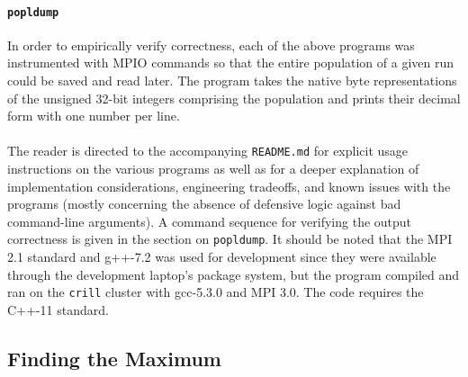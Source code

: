 \documentclass[11pt,epsf]{article}
\begin{document}
{{    \paragraph{\texttt{popldump}}{
      In order to empirically verify correctness, each of the above programs
      was instrumented with MPIO\autocite{MPIO} commands so that the
      entire population of a given run could be saved and read later.
      The program takes the native byte representations of the unsigned
      32-bit integers comprising the population and prints their decimal
      form with one number per line.
    }
    \paragraph{}{
      The reader is directed to the accompanying \texttt{README.md} for
      explicit usage instructions on the various programs as well as
      for a deeper explanation of implementation considerations,
      engineering tradeoffs, and known issues with the programs (mostly
      concerning the absence of defensive logic against bad command-line
      arguments). A command sequence for verifying the output correctness
      is given in the section on \texttt{popldump}. It should be noted
      that the MPI 2.1 standard\autocite{MPI21} and g++-7.2 was used for
      development since they were available through the development laptop's
      package system, but the program compiled and ran on the \texttt{crill}
      cluster with gcc-5.3.0 and MPI 3.0. The code requires the C++-11 standard.
    }
  }
  \subsection{Finding the Maximum}{
}}
\end{document}
